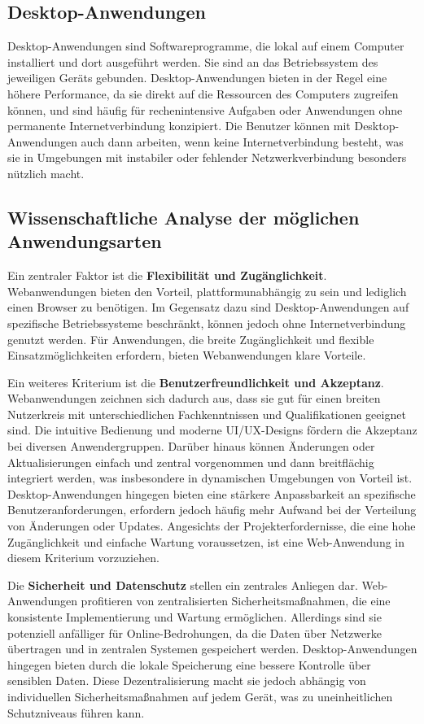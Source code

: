 \subsection*{Desktop-Anwendungen}
Desktop-Anwendungen sind Softwareprogramme, die lokal auf einem Computer installiert und dort ausgeführt werden. Sie sind an das Betriebssystem des jeweiligen Geräts gebunden. Desktop-Anwendungen bieten in der Regel eine höhere Performance, da sie direkt auf die Ressourcen des Computers zugreifen können, und sind häufig für rechenintensive Aufgaben oder Anwendungen ohne permanente Internetverbindung konzipiert. Die Benutzer können mit Desktop-Anwendungen auch dann arbeiten, wenn keine Internetverbindung besteht, was sie in Umgebungen mit instabiler oder fehlender Netzwerkverbindung besonders nützlich macht.

\subsection*{Wissenschaftliche Analyse der möglichen Anwendungsarten}
Ein zentraler Faktor ist die \textbf{Flexibilität und Zugänglichkeit}. Webanwendungen bieten den Vorteil, plattformunabhängig zu sein und lediglich einen Browser zu benötigen. Im Gegensatz dazu sind Desktop-Anwendungen auf spezifische Betriebssysteme beschränkt, können jedoch ohne Internetverbindung genutzt werden. Für Anwendungen, die breite Zugänglichkeit und flexible Einsatzmöglichkeiten erfordern, bieten Webanwendungen klare Vorteile.

Ein weiteres Kriterium ist die \textbf{Benutzerfreundlichkeit und Akzeptanz}. Webanwendungen zeichnen sich dadurch aus, dass sie gut für einen breiten Nutzerkreis mit unterschiedlichen Fachkenntnissen und Qualifikationen geeignet sind. Die intuitive Bedienung und moderne UI/UX-Designs fördern die Akzeptanz bei diversen Anwendergruppen. Darüber hinaus können Änderungen oder Aktualisierungen einfach und zentral vorgenommen und dann breitflächig integriert werden, was insbesondere in dynamischen Umgebungen von Vorteil ist. Desktop-Anwendungen hingegen bieten eine stärkere Anpassbarkeit an spezifische Benutzeranforderungen, erfordern jedoch häufig mehr Aufwand bei der Verteilung von Änderungen oder Updates. Angesichts der Projekterfordernisse, die eine hohe Zugänglichkeit und einfache Wartung voraussetzen, ist eine Web-Anwendung in diesem Kriterium vorzuziehen.

Die \textbf{Sicherheit und Datenschutz} stellen ein zentrales Anliegen dar. 
Web-Anwendungen profitieren von zentralisierten Sicherheitsmaßnahmen, die eine konsistente Implementierung und Wartung ermöglichen. Allerdings sind sie potenziell anfälliger für Online-Bedrohungen, da die Daten über Netzwerke übertragen und in zentralen Systemen gespeichert werden. 
Desktop-Anwendungen hingegen bieten durch die lokale Speicherung eine bessere Kontrolle über sensiblen Daten. Diese Dezentralisierung macht sie jedoch abhängig von individuellen Sicherheitsmaßnahmen auf jedem Gerät, was zu uneinheitlichen Schutzniveaus führen kann.


